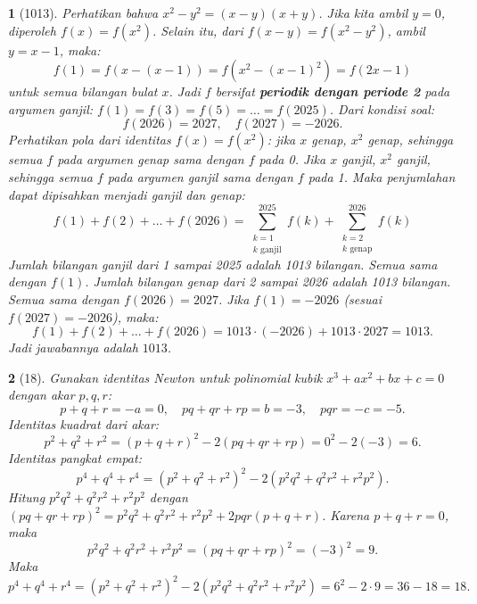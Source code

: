 \documentclass[11pt,a4paper,DIV=12]{scrartcl}
\theoremstyle{problemstyle}
\theoremstyle{answerstyle}
\newtheorem{answer}{}
\begin{document}
\begin{answer}[1013]
  Perhatikan bahwa $x^2 - y^2 = (x-y)(x+y)$. Jika kita ambil $y=0$, diperoleh $f(x) = f(x^2)$.
  Selain itu, dari $f(x-y)=f(x^2-y^2)$, ambil $y = x-1$, maka:
  \[
    f(1) = f(x-(x-1)) = f(x^2-(x-1)^2) = f(2x-1)
  \]
  untuk semua bilangan bulat $x$. Jadi $f$ bersifat \textbf{periodik dengan periode 2} pada argumen ganjil: $f(1)=f(3)=f(5)=\dots=f(2025)$.
  Dari kondisi soal:
  \[
    f(2026) = 2027, \quad f(2027) = -2026.
  \]
  Perhatikan pola dari identitas $f(x) = f(x^2)$: jika $x$ genap, $x^2$ genap, sehingga semua $f$ pada argumen genap sama dengan $f$ pada 0. Jika $x$ ganjil, $x^2$ ganjil, sehingga semua $f$ pada argumen ganjil sama dengan $f$ pada 1.
  Maka penjumlahan dapat dipisahkan menjadi ganjil dan genap:
  \[
    f(1)+f(2)+\dots+f(2026) = \sum_{\substack{k=1\\ k \text{ ganjil}}}^{2025} f(k) + \sum_{\substack{k=2\\ k \text{ genap}}}^{2026} f(k)
  \]
  Jumlah bilangan ganjil dari 1 sampai 2025 adalah 1013 bilangan. Semua sama dengan $f(1)$. Jumlah bilangan genap dari 2 sampai 2026 adalah 1013 bilangan. Semua sama dengan $f(2026)=2027$.
  Jika $f(1)= -2026$ (sesuai $f(2027)=-2026$), maka:
  \[
    f(1)+f(2)+\dots+f(2026) = 1013 \cdot (-2026) + 1013 \cdot 2027 = 1013.
  \]
  Jadi jawabannya adalah $\boxed{1013}$.
\end{answer}

\begin{answer}[18]
  Gunakan identitas Newton untuk polinomial kubik $x^3+ax^2+bx+c=0$ dengan akar $p,q,r$:
  \[
    p+q+r = -a = 0, \quad pq+qr+rp = b = -3, \quad pqr = -c = -5.
  \]
  Identitas kuadrat dari akar:
  \[
    p^2+q^2+r^2 = (p+q+r)^2 - 2(pq+qr+rp) = 0^2 - 2(-3) = 6.
  \]
  Identitas pangkat empat:
  \[
    p^4+q^4+r^4 = (p^2+q^2+r^2)^2 - 2(p^2q^2+q^2r^2+r^2p^2).
  \]
  Hitung $p^2q^2 + q^2r^2 + r^2p^2$ dengan $(pq+qr+rp)^2 = p^2q^2+q^2r^2+r^2p^2 + 2pqr(p+q+r)$. Karena $p+q+r=0$, maka
  \[
    p^2q^2+q^2r^2+r^2p^2 = (pq+qr+rp)^2 = (-3)^2 = 9.
  \]
  Maka
  \[
    p^4+q^4+r^4 = (p^2+q^2+r^2)^2 - 2(p^2q^2+q^2r^2+r^2p^2) = 6^2 - 2\cdot 9 = 36-18=\boxed{18}.
  \]
\end{answer}
\end{document}
